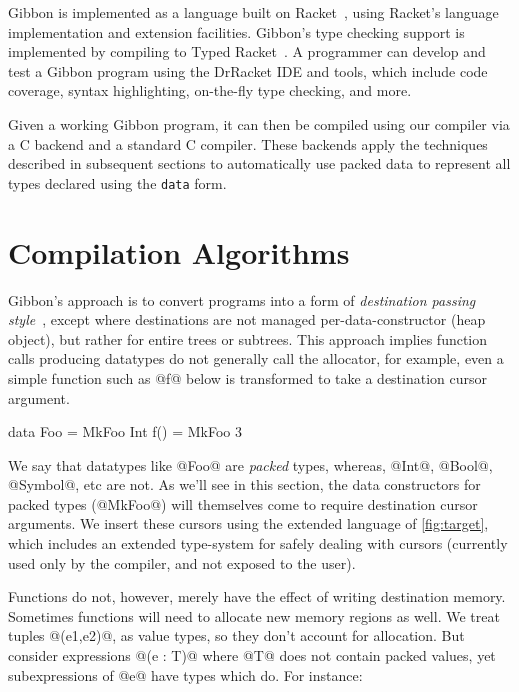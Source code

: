 \documentclass[a4paper,english]{lipics-v2016}
\newcommand{\treelang}{Gibbon\xspace} %
\newif\ifcurly
\newcommand{\finishmecurly}{\ifcurly \Red{FINISHME - do ifcurly version here} \else}
\begin{document}
\treelang is implemented as a language built on Racket~\cite{plt-tr1},
using Racket's language implementation and extension
facilities. \treelang's type checking support is implemented by
compiling to Typed Racket~\cite{popl08}. A programmer can
develop and test a \treelang program using the DrRacket IDE and tools,
which include code coverage, syntax highlighting, on-the-fly type
checking, and more.

Given a working \treelang program, it can then be compiled using our
compiler via a C backend and a standard C compiler. These backends
apply the techniques described in subsequent sections to automatically
use  packed data to represent all types declared using the
\texttt{data} form.  



\section{Compilation Algorithms} \label{sec:compiler}

\treelang{}'s approach is to convert programs into a form of {\em destination
  passing style}~\cite{larus89}, except where destinations are not managed
per-data-constructor (heap object), but rather for entire trees or subtrees.  This approach
implies function calls producing datatypes do not generally call the allocator,
for example, even a simple function such as @f@ below is transformed to take a
destination cursor argument.

\finishmecurly
\begin{code}
  data Foo = MkFoo Int
  f() = MkFoo 3
\end{code}
\fi

We say that datatypes like @Foo@ are {\em packed} types, whereas, @Int@, @Bool@,
@Symbol@, etc are not.  As we'll see in this section, the data constructors for
packed types (@MkFoo@) will themselves come to require destination cursor arguments.
%
We insert these cursors using the extended language of \cref{fig:target}, which
includes an extended type-system for safely dealing with cursors (currently used
only by the compiler, and not exposed to the user).

Functions do not, however, merely have the effect of writing destination memory.
Sometimes functions will need to allocate new memory regions as well.  We treat
tuples @(e1,e2)@, as value types, so they don't account for allocation.  But
consider expressions @(e : T)@ where @T@ does not contain packed values, yet
subexpressions of @e@ have types which do.  For instance:
\end{document}

